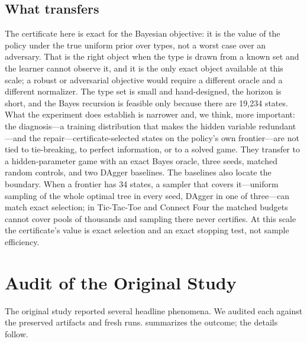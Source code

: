 \documentclass[conference]{IEEEtran}
\begin{document}
\subsection{What transfers}
The certificate here is exact for the Bayesian objective: it is the value of the policy under the true uniform prior over types, not a worst case over an adversary. That is the right object when the type is drawn from a known set and the learner cannot observe it, and it is the only exact object available at this scale; a robust or adversarial objective would require a different oracle and a different normalizer. The type set is small and hand-designed, the horizon is short, and the Bayes recursion is feasible only because there are 19{,}234 states. What the experiment does establish is narrower and, we think, more important: the diagnosis---a training distribution that makes the hidden variable redundant---and the repair---certificate-selected states on the policy's own frontier---are not tied to tie-breaking, to perfect information, or to a solved game. They transfer to a hidden-parameter game with an exact Bayes oracle, three seeds, matched random controls, and two DAgger baselines. The baselines also locate the boundary. When a frontier has 34 states, a sampler that covers it---uniform sampling of the whole optimal tree in every seed, DAgger in one of three---can match exact selection; in Tic-Tac-Toe and Connect Four the matched budgets cannot cover pools of thousands and sampling there never certifies. At this scale the certificate's value is exact selection and an exact stopping test, not sample efficiency.

\section{Audit of the Original Study}
\label{sec:audit}

The original study reported several headline phenomena. We audited each against the preserved artifacts and fresh runs.  summarizes the outcome; the details follow.
\end{document}
